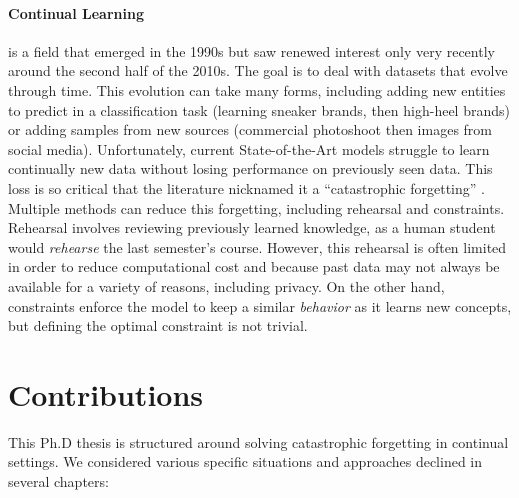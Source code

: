\paragraph{Continual Learning} is a field that emerged in the 1990s but saw renewed interest only
very recently around the second half of the 2010s. The goal is to deal with datasets that evolve
through time. This evolution can take many forms, including adding new entities to predict in a
classification task (\eg learning sneaker brands, then high-heel brands) or adding samples from new
sources (\eg commercial photoshoot then images from social media). Unfortunately, current
State-of-the-Art models struggle to learn continually new data without losing performance on
previously seen data. This loss is so critical that the literature nicknamed it a ``catastrophic
forgetting'' \citep{robins1995catastrophicforgetting}. Multiple methods can reduce
this forgetting, including rehearsal and constraints. Rehearsal involves reviewing
previously learned knowledge, as a human student would \textit{rehearse} the last semester's course.
However, this rehearsal is often limited in order to reduce computational cost and because past data
may not always be available for a variety of reasons, including privacy. On the other hand,
constraints enforce the model to keep a similar \textit{behavior} as it learns new concepts, but
defining the optimal constraint is not trivial.

\section{Contributions}

This Ph.D thesis is structured around solving catastrophic forgetting in continual settings. We
considered various specific situations and approaches declined in several chapters:

